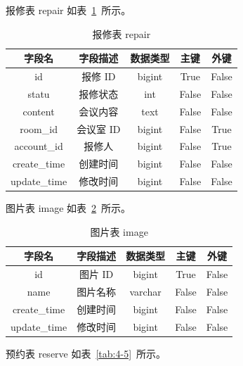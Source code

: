 \documentclass{izdthesis}
\begin{document}
报修表 repair 如表~\ref{tab:4-3}~所示。

\begin{table}[htbp]
  \centering
  \caption{报修表 repair}
  \label{tab:4-3}
  \songti
  \begin{tabular}{|c|c|c|c|c|}
    \hline
    字段名 & 字段描述 & 数据类型 & 主键 & 外键 \\
    \hline
    id & 报修 ID & bigint & True & False \\
    \hline
    statu & 报修状态 & int & False & False \\
    \hline
    content & 会议内容 & text & False & False \\
    \hline
    room\_id & 会议室 ID & bigint & False & True \\
    \hline
    account\_id & 报修人 & bigint & False & True \\
    \hline
    create\_time & 创建时间 & bigint & False & False \\
    \hline
    update\_time & 修改时间 & bigint & False & False \\
    \hline
  \end{tabular}
\end{table}

图片表 image 如表~\ref{tab:4-4}~所示。

\begin{table}[htbp]
  \centering
  \caption{图片表 image}
  \label{tab:4-4}
  \songti
  \begin{tabular}{|c|c|c|c|c|}
    \hline
    字段名 & 字段描述 & 数据类型 & 主键 & 外键 \\
    \hline
    id & 图片 ID & bigint & True & False \\
    \hline
    name & 图片名称 & varchar & False & False \\
    \hline
    create\_time & 创建时间 & bigint & False & False \\
    \hline
    update\_time & 修改时间 & bigint & False & False \\
    \hline
  \end{tabular}
\end{table}

预约表 reserve 如表~\ref{tab:4-5}~所示。
\end{document}
